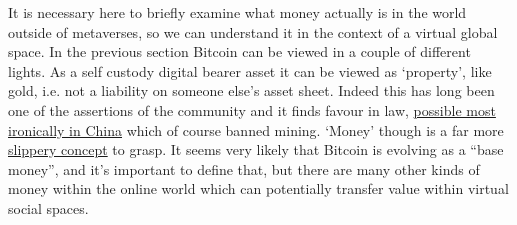 It is necessary here to briefly examine what money actually is in the world outside of metaverses, so we can understand it in the context of a virtual global space. In the previous section Bitcoin can be viewed in a couple of different lights. As a self custody digital bearer asset it can be viewed as `property', like gold, i.e. not a liability on someone else's asset sheet. Indeed this has long been one of the assertions of the community and it finds favour in law, \href{https://www.regulationasia.com/shanghai-court-says-bitcoin-is-protected-by-law-as-virtual-property/}{possible most ironically in China} which of course banned mining. `Money' though is a far more \href{https://www.bankofengland.co.uk/knowledgebank/what-is-money}{slippery concept} to grasp. It seems very likely that Bitcoin is evolving as a ``base money'', and it's important to define that, but there are many other kinds of money within the online world which can potentially transfer value within virtual social spaces.
